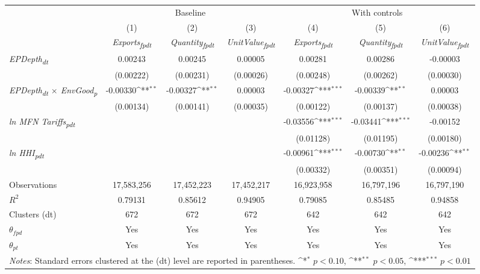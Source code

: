 {
\def\sym#1{\ifmmode^{#1}\else\(^{#1}\)\fi}
\begin{tabular}{l*{6}{c}}
\toprule
&\multicolumn{3}{c}{Baseline}&\multicolumn{3}{c}{With controls}\\\cmidrule(lr){2-4}\cmidrule(lr){5-7}
&(1)&(2)&(3)&(4)&(5)&(6)\\
&\textit{Exports\textsubscript{fpdt}}&\textit{Quantity\textsubscript{fpdt}}&\textit{UnitValue\textsubscript{fpdt}}&\textit{Exports\textsubscript{fpdt}}&\textit{Quantity\textsubscript{fpdt}}&\textit{UnitValue\textsubscript{fpdt}}\\
\midrule
\textit{EPDepth\textsubscript{dt}} & 0.00243 & 0.00245 & 0.00005 & 0.00281 & 0.00286 & -0.00003\\
 & (0.00222) & (0.00231) & (0.00026) & (0.00248) & (0.00262) & (0.00030)\\
\addlinespace
\textit{EPDepth\textsubscript{dt} $\times$ EnvGood\textsubscript{p}} & -0.00330\sym{**} & -0.00327\sym{**} & 0.00003 & -0.00327\sym{***} & -0.00339\sym{**} & 0.00003\\
 & (0.00134) & (0.00141) & (0.00035) & (0.00122) & (0.00137) & (0.00038)\\
\addlinespace
\textit{ln MFN Tariffs\textsubscript{pdt}} &  &  &  & -0.03556\sym{***} & -0.03441\sym{***} & -0.00152\\
 &  &  &  & (0.01128) & (0.01195) & (0.00180)\\
\addlinespace
\textit{ln HHI\textsubscript{pdt}} &  &  &  & -0.00961\sym{***} & -0.00730\sym{**} & -0.00236\sym{**}\\
 &  &  &  & (0.00332) & (0.00351) & (0.00094)\\
\midrule
Observations & 17,583,256 & 17,452,223 & 17,452,217 & 16,923,958 & 16,797,196 & 16,797,190\\
$R^{2}$ & 0.79131 & 0.85612 & 0.94905 & 0.79085 & 0.85485 & 0.94858\\
Clusters (dt) & 672 & 672 & 672 & 642 & 642 & 642\\
$\theta_{fpd}$ & Yes & Yes & Yes & Yes & Yes & Yes\\
$\theta_{pt}$ & Yes & Yes & Yes & Yes & Yes & Yes\\
\bottomrule
\multicolumn{7}{l}{\footnotesize \textit{Notes}: Standard errors clustered at the (dt) level are reported in parentheses. \sym{*} \(p<0.10\), \sym{**} \(p<0.05\), \sym{***} \(p<0.01\)}\\
\end{tabular}
}
